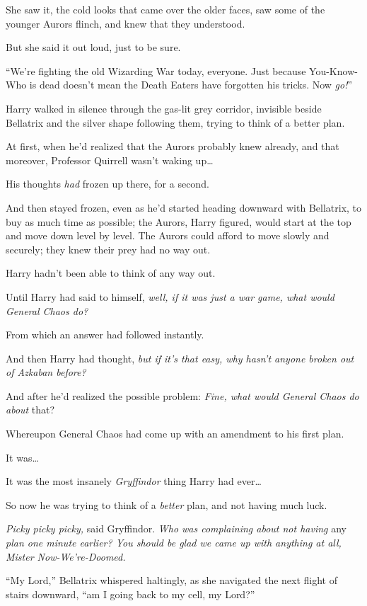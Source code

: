 She saw it, the cold looks that came over the older faces, saw some of the younger Aurors flinch, and knew that they understood.

But she said it out loud, just to be sure.

“We’re fighting the old Wizarding War today, everyone. Just because You-Know-Who is dead doesn’t mean the Death Eaters have forgotten his tricks. Now \emph{go!}”

\later

Harry walked in silence through the gas-lit grey corridor, invisible beside Bellatrix and the silver shape following them, trying to think of a better plan.

At first, when he’d realized that the Aurors probably knew already, and that moreover, Professor Quirrell wasn’t waking up…

His thoughts \emph{had} frozen up there, for a second.

And then stayed frozen, even as he’d started heading downward with Bellatrix, to buy as much time as possible; the Aurors, Harry figured, would start at the top and move down level by level. The Aurors could afford to move slowly and securely; they knew their prey had no way out.

Harry hadn’t been able to think of any way out.

Until Harry had said to himself, \emph{well, if it was just a war game, what would General Chaos do?}

From which an answer had followed instantly.

And then Harry had thought, \emph{but if it’s \emph{that} easy, why hasn’t anyone broken out of Azkaban before?}

And after he’d realized the possible problem: \emph{Fine, what would General Chaos do about} that?

Whereupon General Chaos had come up with an amendment to his first plan.

It was…

It was the most insanely \emph{Gryffindor} thing Harry had ever…

So now he was trying to think of a \emph{better} plan, and not having much luck.

\emph{Picky picky picky,} said Gryffindor. \emph{Who was complaining about not having} any \emph{plan one minute earlier? You should be glad we came up with anything at all, Mister Now-We’re-Doomed.}

“My Lord,” Bellatrix whispered haltingly, as she navigated the next flight of stairs downward, “am I going back to my cell, my Lord?”

